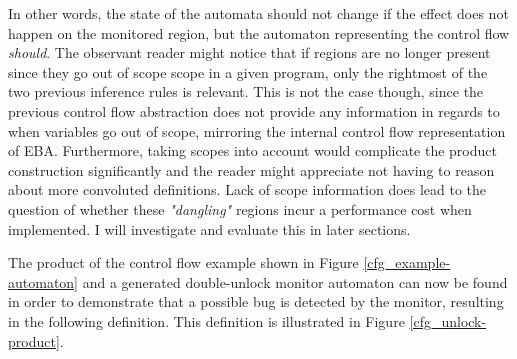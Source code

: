 \newpar In other words, the state of the automata should not change if the effect does not happen on the monitored region, but the automaton representing the control flow \textit{should}. The observant reader might notice that if regions are no longer present since they go out of scope scope in a given program, only the rightmost of the two previous inference rules is relevant. This is not the case though, since the previous control flow abstraction does not provide any information in regards to when variables go out of scope, mirroring the internal control flow representation of EBA. Furthermore, taking scopes into account would complicate the product construction significantly and the reader might appreciate not having to reason about more convoluted definitions. Lack of scope information does lead to the question of whether these \textit{"dangling"} regions incur a performance cost when implemented. I will investigate and evaluate this in later sections.   

\newpar The product of the control flow example shown in Figure \ref{cfg_example-automaton} and a generated double-unlock monitor automaton can now be found in order to demonstrate that a possible bug is detected by the monitor, resulting in the following definition. This definition is illustrated in Figure \ref{cfg_unlock-product}. 

